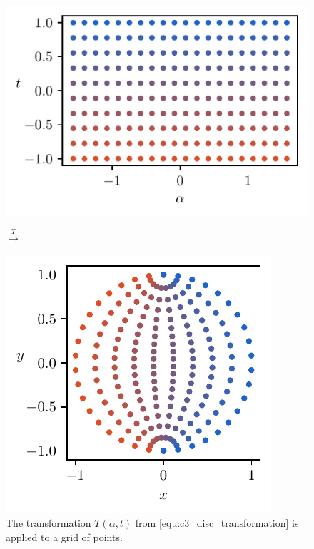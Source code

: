 \begin{figure}
    \begin{center}
        \begin{minipage}{.53\textwidth}
            \includegraphics[scale=.75]{img/chapter3/on_disc/disc_original.pdf}%
        \end{minipage}\begin{minipage}{.05\textwidth}\begin{center}
                \Large $ \xrightarrow{T} $
            \end{center}
        \end{minipage}\begin{minipage}{.42\textwidth}\centering
            \includegraphics[scale=.75]{img/chapter3/on_disc/disc_transformed.pdf}
        \end{minipage}
    \end{center}
    \caption{The transformation $T(\alpha, t)$ from \eqref{equ:c3_disc_transformation} is applied to a grid of points.}
    \label{fig:c3_disc_transformation}
\end{figure}



